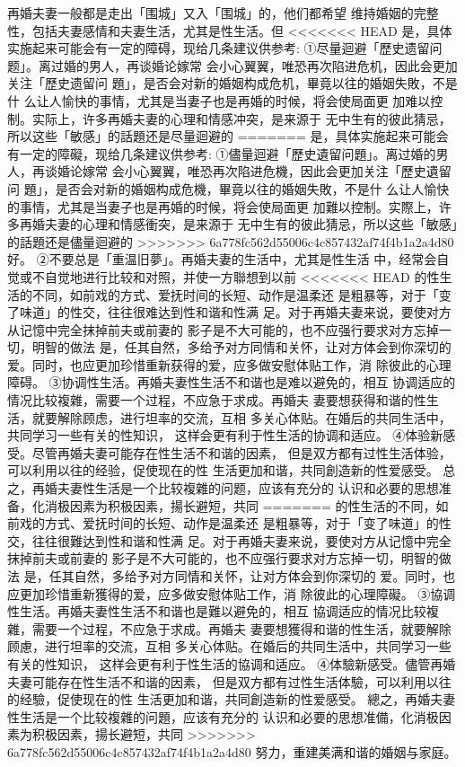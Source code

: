 \documentclass[12pt,UTF8]{ctexbook}
\begin{document}
再婚夫妻一般都是走出「围城」又入「围城」的，他们都希望
维持婚姻的完整性，包括夫妻感情和夫妻生活，尤其是性生活。但
<<<<<<< HEAD
是，具体实施起来可能会有一定的障碍，现给几条建议供参考:
①尽量迴避「歷史遗留问题」。离过婚的男人，再谈婚论嫁常
会小心翼翼，唯恐再次陷进危机，因此会更加关注「歷史遗留问
題」，是否会对新的婚姻构成危机，畢竟以往的婚姻失敗，不是什
么让人愉快的事情，尤其是当妻子也是再婚的时候，将会使局面更
加难以控制。实际上，许多再婚夫妻的心理和情感冲突，是来源于
无中生有的彼此猜忌，所以这些「敏感」的話題还是尽量迴避的
=======
是，具体实施起来可能会有一定的障礙，现给几条建议供参考:
①儘量迴避「歷史遺留问題」。离过婚的男人，再谈婚论嫁常
会小心翼翼，唯恐再次陷进危機，因此会更加关注「歷史遺留问
題」，是否会对新的婚姻构成危機，畢竟以往的婚姻失敗，不是什
么让人愉快的事情，尤其是当妻子也是再婚的时候，将会使局面更
加難以控制。实際上，许多再婚夫妻的心理和情感衝突，是来源于
无中生有的彼此猜忌，所以这些「敏感」的話題还是儘量迴避的
>>>>>>> 6a778fc562d55006c4c857432af74f4b1a2a4d80
好。
②不要总是「重温旧夢」。再婚夫妻的生活中，尤其是性生活
中，经常会自觉或不自觉地进行比较和对照，并使一方聯想到以前
<<<<<<< HEAD
的性生活的不同，如前戏的方式、爱抚时间的长短、动作是温柔还
是粗暴等，对于「变了味道」的性交，往往很难达到性和谐和性满
足。对于再婚夫妻来说，要使对方从记憶中完全抹掉前夫或前妻的
影子是不大可能的，也不应强行要求对方忘掉一切，明智的做法
是，任其自然，多给予对方同情和关怀，让对方体会到你深切的
爱。同时，也应更加珍惜重新获得的爱，应多做安慰体贴工作，消
除彼此的心理障碍。
③协调性生活。再婚夫妻性生活不和谐也是难以避免的，相互
协调适应的情况比较複雜，需要一个过程，不应急于求成。再婚夫
妻要想获得和谐的性生活，就要解除顾虑，进行坦率的交流，互相
多关心体贴。在婚后的共同生活中，共同学习一些有关的性知识，
这样会更有利于性生活的协调和适应。
④体验新感受。尽管再婚夫妻可能存在性生活不和谐的因素，
但是双方都有过性生活体验，可以利用以往的经验，促使现在的性
生活更加和谐，共同創造新的性爱感受。
总之，再婚夫妻性生活是一个比较複雜的问题，应该有充分的
认识和必要的思想准备，化消极因素为积极因素，揚长避短，共同
=======
的性生活的不同，如前戏的方式、爱抚时间的长短、动作是温柔还
是粗暴等，对于「变了味道」的性交，往往很難达到性和谐和性满
足。对于再婚夫妻来说，要使对方从记憶中完全抹掉前夫或前妻的
影子是不大可能的，也不应强行要求对方忘掉一切，明智的做法
是，任其自然，多给予对方同情和关怀，让对方体会到你深切的
爱。同时，也应更加珍惜重新獲得的爱，应多做安慰体贴工作，消
除彼此的心理障礙。
③協调性生活。再婚夫妻性生活不和谐也是難以避免的，相互
協调适应的情况比较複雜，需要一个过程，不应急于求成。再婚夫
妻要想獲得和谐的性生活，就要解除顾慮，进行坦率的交流，互相
多关心体贴。在婚后的共同生活中，共同学习一些有关的性知识，
这样会更有利于性生活的協调和适应。
④体驗新感受。儘管再婚夫妻可能存在性生活不和谐的因素，
但是双方都有过性生活体驗，可以利用以往的经驗，促使现在的性
生活更加和谐，共同創造新的性爱感受。
總之，再婚夫妻性生活是一个比较複雜的问題，应该有充分的
认识和必要的思想准備，化消极因素为积极因素，揚长避短，共同
>>>>>>> 6a778fc562d55006c4c857432af74f4b1a2a4d80
努力，重建美满和谐的婚姻与家庭。
\end{document}
